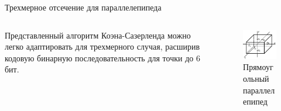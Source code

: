 \documentclass{beamer}
\begin{document}
	\begin{frame}{Трехмерное отсечение}{ для параллелепипеда}
		
		\begin{columns}
			\begin{column}{0.5\textwidth}
				Представленный алгоритм Коэна-Сазерленда можно легко адаптировать для трехмерного случая, расширив кодовую бинарную последовательность для точки до 6 бит.
			\end{column}
			\begin{column}{0.5\textwidth}
				\begin{figure} 
					\includegraphics[width=1.0\textwidth]{images/clipping_1.jpg}
					\caption {Прямоугольный параллелепипед}
				\end{figure}
		\end{column}
	\end{columns}






	\end{frame}
\end{document}
